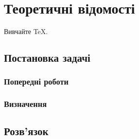 \chapter{Теоретичні відомості}

Вивчайте \TeX \cite{Knuth:1984}.

\section{Постановка задачі}
\subsection{Попередні роботи}
\subsection{Визначення}
\section{Розв'язок}
